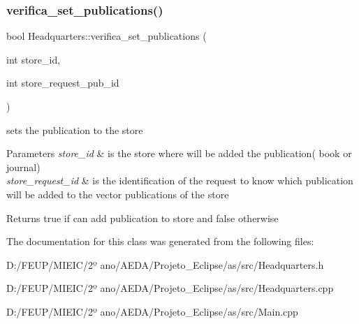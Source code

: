 \subsubsection{\texorpdfstring{verifica\+\_\+set\+\_\+publications()}{verifica\_set\_publications()}}
{\footnotesize\ttfamily bool Headquarters\+::verifica\+\_\+set\+\_\+publications (\begin{DoxyParamCaption}\item[{int}]{store\+\_\+id,  }\item[{int}]{store\+\_\+request\+\_\+pub\+\_\+id }\end{DoxyParamCaption})}



sets the publication to the store 


\begin{DoxyParams}{Parameters}
{\em store\+\_\+id} & is the store where will be added the publication( book or journal) \\
\hline
{\em store\+\_\+request\+\_\+id} & is the identification of the request to know which publication will be added to the vector publications of the store\\
\hline
\end{DoxyParams}
\begin{DoxyReturn}{Returns}
true if can add publication to store and false otherwise 
\end{DoxyReturn}


The documentation for this class was generated from the following files\+:\begin{DoxyCompactItemize}
\item 
D\+:/\+F\+E\+U\+P/\+M\+I\+E\+I\+C/2º ano/\+A\+E\+D\+A/\+Projeto\+\_\+\+Eclipse/as/src/Headquarters.\+h\item 
D\+:/\+F\+E\+U\+P/\+M\+I\+E\+I\+C/2º ano/\+A\+E\+D\+A/\+Projeto\+\_\+\+Eclipse/as/src/Headquarters.\+cpp\item 
D\+:/\+F\+E\+U\+P/\+M\+I\+E\+I\+C/2º ano/\+A\+E\+D\+A/\+Projeto\+\_\+\+Eclipse/as/src/Main.\+cpp\end{DoxyCompactItemize}
